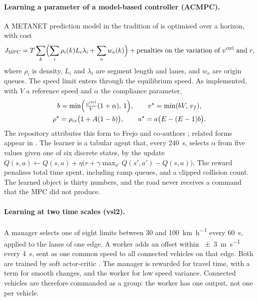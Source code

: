 \paragraph{Learning a parameter of a model-based controller (ACMPC).}
A METANET prediction model in the tradition of \textcite{Hegyi2005}\verify{} is optimised over a horizon, with cost
\begin{equation}
J_{\mathrm{MPC}}=T\sum_{k}\Bigl(\sum_i \rho_i(k)L_i\lambda_i+\sum_o w_o(k)\Bigr)+\text{penalties on the variation of }v^{\mathrm{ctrl}}\text{ and }r,
\end{equation}
where $\rho_i$ is density, $L_i$ and $\lambda_i$ are segment length and lanes, and $w_o$ are origin queues. The speed limit enters through the equilibrium speed. As implemented, with $V$ a reference speed and $\alpha$ the compliance parameter,
\begin{equation}
\begin{gathered}
b=\min\Bigl(\tfrac{v^{\mathrm{ctrl}}}{V}(1+\alpha),\,1\Bigr),\qquad v^{\star}=\min(bV,\,v_f),\\
\rho^{\star}=\rho_{\mathrm{cr}}\bigl(1+A(1-b)\bigr),\qquad a^{\star}=a\bigl(E-(E-1)b\bigr).
\end{gathered}\label{eq:frejo}
\end{equation}
The repository attributes this form to Frejo and co-authors ; related forms appear in \textcite{Carlson2010}\verify. The learner is a tabular agent that, every \SI{240}{\second}, selects $\alpha$ from five values given one of six discrete states, by the update $Q(s,a)\leftarrow Q(s,a)+\eta\bigl(r+\gamma\max_{a'}Q(s',a')-Q(s,a)\bigr)$. The reward penalises total time spent, including ramp queues, and a clipped collision count. The learned object is thirty numbers, and the road never receives a command that the MPC did not produce.

\paragraph{Learning at two time scales (vsl2).}
A manager selects one of eight limits between 30 and \SI{100}{\kilo\metre\per\hour} every \SI{60}{\second}, applied to the lanes of one edge. A worker adds an offset within \SI{\pm 3}{\metre\per\second} every \SI{4}{\second}, sent as one common speed to all connected vehicles on that edge. Both are trained by soft actor-critic \parencite{Haarnoja2018}\verify{}. The manager is rewarded for travel time, with a term for smooth changes, and the worker for low speed variance. Connected vehicles are therefore commanded as a group: the worker has one output, not one per vehicle.

